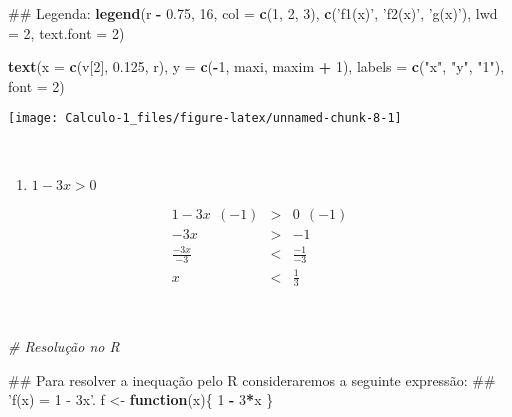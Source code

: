 \documentclass[]{book}
\newenvironment{Shaded}{\begin{snugshade}}{\end{snugshade}}
\newcommand{\KeywordTok}[1]{\textcolor[rgb]{0.13,0.29,0.53}{\textbf{#1}}}
\newcommand{\DataTypeTok}[1]{\textcolor[rgb]{0.13,0.29,0.53}{#1}}
\newcommand{\DecValTok}[1]{\textcolor[rgb]{0.00,0.00,0.81}{#1}}
\newcommand{\FloatTok}[1]{\textcolor[rgb]{0.00,0.00,0.81}{#1}}
\newcommand{\StringTok}[1]{\textcolor[rgb]{0.31,0.60,0.02}{#1}}
\newcommand{\CommentTok}[1]{\textcolor[rgb]{0.56,0.35,0.01}{\textit{#1}}}
\newcommand{\ControlFlowTok}[1]{\textcolor[rgb]{0.13,0.29,0.53}{\textbf{#1}}}
\newcommand{\OperatorTok}[1]{\textcolor[rgb]{0.81,0.36,0.00}{\textbf{#1}}}
\newcommand{\NormalTok}[1]{#1}
\providecommand{\tightlist}{%
  \setlength{\itemsep}{0pt}\setlength{\parskip}{0pt}}
\begin{document}
\begin{enumerate}
\begin{Shaded}
\begin{Highlighting}[]
\NormalTok{##  Legenda:}
\KeywordTok{legend}\NormalTok{(r }\OperatorTok{-}\StringTok{ }\FloatTok{0.75}\NormalTok{, }\DecValTok{16}\NormalTok{, }\DataTypeTok{col =} \KeywordTok{c}\NormalTok{(}\DecValTok{1}\NormalTok{, }\DecValTok{2}\NormalTok{, }\DecValTok{3}\NormalTok{), }\KeywordTok{c}\NormalTok{(}\StringTok{'f1(x)'}\NormalTok{, }\StringTok{'f2(x)'}\NormalTok{, }\StringTok{'g(x)'}\NormalTok{),}
   \DataTypeTok{lwd =} \DecValTok{2}\NormalTok{, }\DataTypeTok{text.font =} \DecValTok{2}\NormalTok{)}

\KeywordTok{text}\NormalTok{(}\DataTypeTok{x =} \KeywordTok{c}\NormalTok{(v[}\DecValTok{2}\NormalTok{], }\FloatTok{0.125}\NormalTok{, r), }\DataTypeTok{y =} \KeywordTok{c}\NormalTok{(}\OperatorTok{-}\DecValTok{1}\NormalTok{, maxi, maxim }\OperatorTok{+}\StringTok{ }\DecValTok{1}\NormalTok{),}
 \DataTypeTok{labels =} \KeywordTok{c}\NormalTok{(}\StringTok{"x"}\NormalTok{, }\StringTok{"y"}\NormalTok{, }\StringTok{"1"}\NormalTok{), }\DataTypeTok{font =} \DecValTok{2}\NormalTok{)}
\end{Highlighting}
\end{Shaded}

  \begin{center}\texttt{[image: Calculo-1\_files/figure-latex/unnamed-chunk-8-1]} \end{center}

  ~

  \begin{enumerate}
  \def\labelenumii{\alph{enumii})}
  \setcounter{enumii}{4}
  \tightlist
  \item
    \(1-3x > 0\)
  \end{enumerate}

  \begin{eqnarray}
  1-3x \ \ (-1) &>& 0 \ \ (-1) \nonumber \\
  -3x &>& -1 \nonumber \\
  \frac{-3x}{-3} &<& \frac{-1}{-3} \nonumber \\
  x &<& \frac{1}{3} \nonumber
  \end{eqnarray}

  ~

\begin{Shaded}
\begin{Highlighting}[]
\CommentTok{# Resolução no R}

\NormalTok{##  Para resolver a inequação pelo R consideraremos a seguinte expressão:}
\NormalTok{## 'f(x) = 1 - 3x'.}
\NormalTok{f <-}\StringTok{ }\ControlFlowTok{function}\NormalTok{(x)\{}
  \DecValTok{1} \OperatorTok{-}\StringTok{ }\DecValTok{3}\OperatorTok{*}\NormalTok{x}
\NormalTok{\}}


\end{Highlighting}
\end{Shaded}
\end{enumerate}
\end{document}
